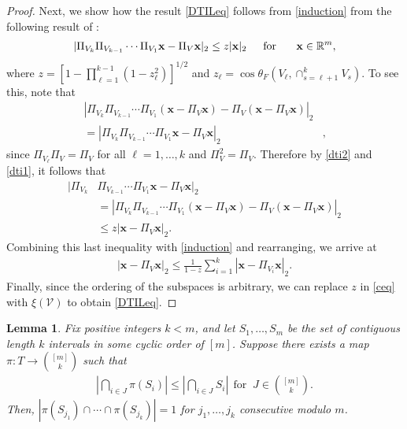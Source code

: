 \documentclass[journal, twocolumn]{IEEEtran}
\newtheorem{lemma}{Lemma}
\begin{document}
\begin{proof}
Next, we show how the result \eqref{DTILeq} follows from \eqref{induction} from the following result of \cite[Theorem 9.33]{Deutsch12}:
\begin{align}\label{dti2}
|\Pi_{V_k}\Pi_{V_{k-1}}\cdots\Pi_{V_1} \mathbf{x} - \Pi_V\mathbf{x}|_2 \leq z |\mathbf{x}|_2 \indent \text{for } \indent \mathbf{x} \in \mathbb{R}^m,
\end{align}
where $z= \left[1 - \prod_{\ell =1}^{k-1}(1-z_{\ell}^2)\right]^{1/2}$ and $z_{\ell} = \cos\theta_F\left(V_{\ell}, \cap_{s=\ell+1}^k V_s\right)$. To see this, note that
\begin{align}\label{dti1}
|\Pi_{V_k}\Pi_{V_{k-1}}\cdots\Pi_{V_1}(\mathbf{x} - \Pi_V\mathbf{x}) - \Pi_V(\mathbf{x} - \Pi_V\mathbf{x})|_2& \\
= |\Pi_{V_k}\Pi_{V_{k-1}}\cdots\Pi_{V_1} \mathbf{x} - \Pi_V \mathbf{x} |_2&,
\end{align}
since $\Pi_{V_\ell} \Pi_V = \Pi_V$ for all $\ell = 1, \ldots, k$ and $\Pi_V^2 = \Pi_V$.
Therefore by \eqref{dti2} and \eqref{dti1}, it follows that
\begin{align*}
|\Pi_{V_k}&\Pi_{V_{k-1}}\cdots\Pi_{V_1} \mathbf{x} - \Pi_V \mathbf{x} |_2 \\
&= |\Pi_{V_k}\Pi_{V_{k-1}}\cdots\Pi_{V_1}(\mathbf{x} - \Pi_V\mathbf{x}) - \Pi_V(\mathbf{x} - \Pi_V\mathbf{x})|_2 \\
&\leq z |\mathbf{x} - \Pi_V\mathbf{x}|_2.
\end{align*}
Combining this last inequality with \eqref{induction} and rearranging, we arrive at
\begin{align}\label{ceq}
|\mathbf{x} - \Pi_V \mathbf{x}|_2 \leq \frac{1}{1 - z} \sum_{i=1}^k |\mathbf{x} - \Pi_{V_i} \mathbf{x}|_2.
\end{align}
Finally, since the ordering of the subspaces is arbitrary, we can replace $z$ in \eqref{ceq} with $\xi(\mathcal{V})$ to obtain \eqref{DTILeq}.
\end{proof}


\begin{lemma}\label{NonEmptyLemma} Fix positive integers $k < m$, and let $S_1, \ldots, S_m$ be the set of contiguous length $k$ intervals in some cyclic order of $[m]$. Suppose there exists a map $\pi: T \to {[m] \choose k}$ such that
\begin{align}\label{NonEmpty}
|\bigcap_{i \in J} \pi(S_i)| \leq |\bigcap_{i \in J} S_i | \ \ \text{for } \ J \in {[m] \choose k}.
\end{align}
%
Then, $|\pi(S_{j_1}) \cap \cdots \cap \pi(S_{j_k})| = 1$ for $j_1,\ldots,j_k$ consecutive modulo $m$.
\end{lemma}
\end{document}
